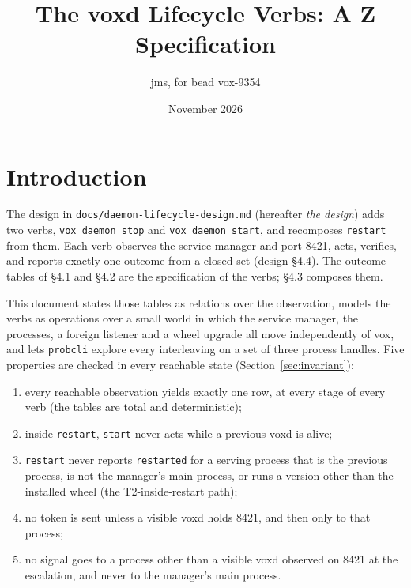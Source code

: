 \documentclass[a4paper,10pt,fleqn]{article}
\begin{document}
\title{The voxd Lifecycle Verbs: A Z Specification}
\author{jms, for bead vox-9354}
\date{November 2026}
\maketitle

\tableofcontents
\newpage

\section{Introduction}

The design in \texttt{docs/daemon-lifecycle-design.md} (hereafter \emph{the
design}) adds two verbs, \texttt{vox daemon stop} and \texttt{vox daemon
start}, and recomposes \texttt{restart} from them. Each verb observes the
service manager and port 8421, acts, verifies, and reports exactly one outcome
from a closed set (design \S4.4). The outcome tables of \S4.1 and \S4.2 are the
specification of the verbs; \S4.3 composes them.

This document states those tables as relations over the observation, models
the verbs as operations over a small world in which the service manager, the
processes, a foreign listener and a wheel upgrade all move independently of
vox, and lets \texttt{probcli} explore every interleaving on a set of three
process handles. Five properties are checked in every reachable state
(Section~\ref{sec:invariant}):

\begin{enumerate}
  \item[P1] every reachable observation yields exactly one row, at every stage
    of every verb (the tables are total and deterministic);
  \item[P2] inside \texttt{restart}, \texttt{start} never acts while a previous
    voxd is alive;
  \item[P3] \texttt{restart} never reports \texttt{restarted} for a serving
    process that is the previous process, is not the manager's main process,
    or runs a version other than the installed wheel (the T2-inside-restart
    path);
  \item[P4] no token is sent unless a visible voxd holds 8421, and then only
    to that process;
  \item[P5] no signal goes to a process other than a visible voxd observed on
    8421 at the escalation, and never to the manager's main process.
\end{enumerate}
\end{document}
